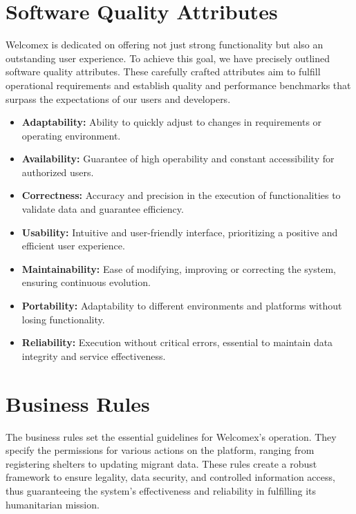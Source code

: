 \documentclass{scrreprt}
\begin{document}
\section{Software Quality Attributes}
Welcomex is dedicated on offering not just strong functionality but also an outstanding user experience. To achieve this goal, we have precisely outlined software quality attributes. These carefully crafted attributes aim to fulfill operational requirements and establish quality and performance benchmarks that surpass the expectations of our users and developers. 

\begin{itemize}
    \item \textbf{Adaptability:} Ability to quickly adjust to changes in requirements or operating environment.
    \item \textbf{Availability:} Guarantee of high operability and constant accessibility for authorized users.
    \item \textbf{Correctness:} Accuracy and precision in the execution of functionalities to validate data and guarantee efficiency.
    \item \textbf{Usability:} Intuitive and user-friendly interface, prioritizing a positive and efficient user experience.
    \item \textbf{Maintainability:} Ease of modifying, improving or correcting the system, ensuring continuous evolution.
    \item \textbf{Portability:} Adaptability to different environments and platforms without losing functionality.
    \item \textbf{Reliability:} Execution without critical errors, essential to maintain data integrity and service effectiveness.
\end{itemize}
\section{Business Rules}
The business rules set the essential guidelines for Welcomex's operation. They specify the permissions for various actions on the platform, ranging from registering shelters to updating migrant data. These rules create a robust framework to ensure legality, data security, and controlled information access, thus guaranteeing the system's effectiveness and reliability in fulfilling its humanitarian mission.
\end{document}
